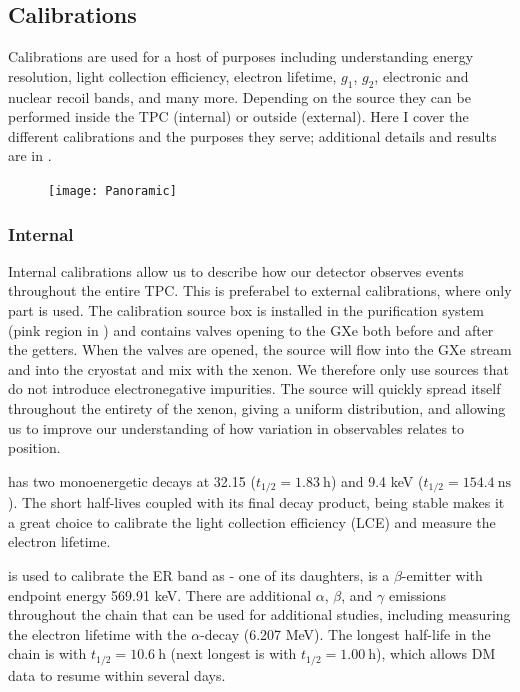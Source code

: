 \subsection{Calibrations}
\label{subsec:xenon1t_calibrations}
Calibrations are used for a host of purposes including understanding energy resolution, light collection efficiency, electron lifetime,
$g_1$, $g_2$, electronic and nuclear recoil bands, and many more.  Depending on the source they can be performed inside the TPC (internal) or
outside (external).  Here I cover the different calibrations and the purposes they serve; additional details and results are in
.

\begin{figure}
\centering
\texttt{[image: Panoramic]}
\label{fig:xenon1t_panoramic}
\end{figure}

\subsubsection{Internal}
\label{subsubsec:xenon1t_calibrations_internal}
Internal calibrations allow us to describe how our detector observes events throughout the entire TPC.  This is preferabel to external
calibrations, where only part is used.  The calibration source box is installed in the purification system (pink region in
) and contains valves opening to the GXe both before and after the getters.  When the valves are opened,
the source will flow into the GXe stream and into the cryostat and mix with the xenon.  We therefore only use sources that do not introduce
electronegative impurities.  The source will quickly spread itself throughout the entirety of the xenon, giving a uniform distribution,
and allowing us to improve our understanding of how variation in observables relates to position.

\kryptonmeta has two monoenergetic decays at 32.15 ($t_{1/2} = 1.83\ \mathrm{h}$) and 9.4 keV ($t_{1/2} = 154.4\ \mathrm{ns}$).  The short
half-lives coupled with its final decay product,  being stable makes it a great choice to calibrate the light collection
efficiency (LCE) and measure the electron lifetime.

\radoncal is used to calibrate the ER band as  - one of its daughters, is a $\beta$-emitter with endpoint energy
569.91 keV.  There are additional $\alpha$, $\beta$, and $\gamma$ emissions throughout the chain that can be used for additional studies,
including measuring the electron lifetime with the  $\alpha$-decay (6.207 MeV).  The longest half-life in the chain is
 with $t_{1/2} = 10.6\ \mathrm{h}$ (next longest is  with $t_{1/2} = 1.00\ \mathrm{h}$), which allows DM data
to resume within several days.

